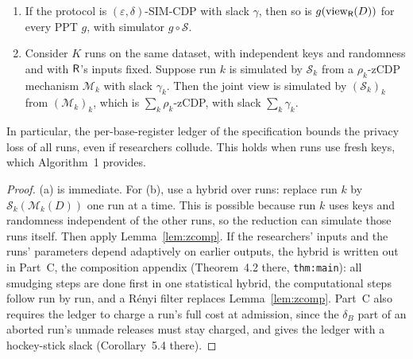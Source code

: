 \begin{lemma}\label{lem:simcomp}
\begin{enumerate}[nosep,label=(\alph*)]
  \item If the protocol is $(\varepsilon,\delta)$-SIM-CDP with slack $\gamma$, then so is $g(\mathrm{view}_{\mathsf{R}}(D))$ for every PPT $g$, with simulator $g\circ\mathcal S$.
  \item Consider $K$ runs on the same dataset, with independent keys and randomness and with $\mathsf{R}$'s inputs fixed. Suppose run $k$ is simulated by $\mathcal S_k$ from a $\rho_k$-zCDP mechanism $\mathcal M_k$ with slack $\gamma_k$. Then the joint view is simulated by $(\mathcal S_k)_k$ from $(\mathcal M_k)_k$, which is $\sum_k\rho_k$-zCDP, with slack $\sum_k\gamma_k$.
\end{enumerate}
In particular, the per-base-register ledger of the specification bounds the privacy loss of all runs, even if researchers collude. This holds when runs use fresh keys, which Algorithm~1 provides.
\end{lemma}
\begin{proof}
(a) is immediate. For (b), use a hybrid over runs: replace run $k$ by $\mathcal S_k(\mathcal M_k(D))$ one run at a time. This is possible because run $k$ uses keys and randomness independent of the other runs, so the reduction can simulate those runs itself. Then apply Lemma~\ref{lem:zcomp}. If the researchers' inputs and the runs' parameters depend adaptively on earlier outputs, the hybrid is written out in Part~C, the composition appendix (Theorem~4.2 there, \texttt{thm:main}): all smudging steps are done first in one statistical hybrid, the computational steps follow run by run, and a R\'enyi filter replaces Lemma~\ref{lem:zcomp}. Part~C also requires the ledger to charge a run's full cost at admission, since the $\delta_B$ part of an aborted run's unmade releases must stay charged, and gives the ledger with a hockey-stick slack (Corollary~5.4 there).
\end{proof}
